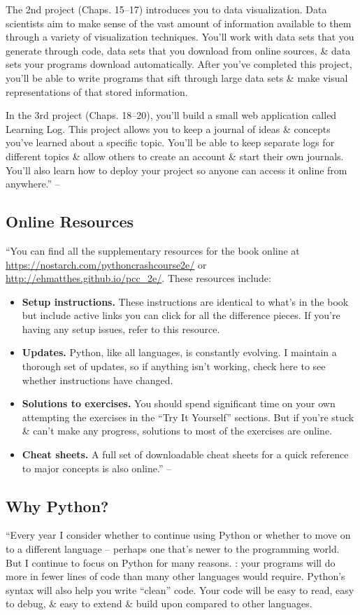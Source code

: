 \documentclass[oneside]{book}
\numberwithin{equation}{section}
\begin{document}
The 2nd project (Chaps. 15--17) introduces you to data visualization. Data scientists aim to make sense of the vast amount of information available to them through a variety of visualization techniques. You'll work with data sets that you generate through code, data sets that you download from online sources, \& data sets your programs download automatically. After you've completed this project, you'll be able to write programs that sift through large data sets \& make visual representations of that stored information.

In the 3rd project (Chaps. 18--20), you'll build a small web application called Learning Log. This project allows you to keep a journal of ideas \& concepts you've learned about a specific topic. You'll be able to keep separate logs for different topics \& allow others to create an account \& start their own journals. You'll also learn how to deploy your project so anyone can access it online from anywhere.'' -- \cite[Introduction, pp. xxxiv--xxxv]{Matthes2019}

\subsection*{Online Resources}
``You can find all the supplementary resources for the book online at \url{https://nostarch.com/pythoncrashcourse2e/} or \url{http://ehmatthes.github.io/pcc_2e/}. These resources include:
\begin{itemize}
	\item \textbf{Setup instructions.} These instructions are identical to what's in the book but include active links you can click for all the difference pieces. If you're having any setup issues, refer to this resource.
	\item \textbf{Updates.} Python, like all languages, is constantly evolving. I maintain a thorough set of updates, so if anything isn't working, check here to see whether instructions have changed.
	\item \textbf{Solutions to exercises.} You should spend significant time on your own attempting the exercises in the ``Try It Yourself'' sections. But if you're stuck \& can't make any progress, solutions to most of the exercises are online.
	\item \textbf{Cheat sheets.} A full set of downloadable cheat sheets for a quick reference to major concepts is also online.'' -- \cite[Introduction, p. xxxv]{Matthes2019}
\end{itemize}

\subsection*{Why Python?}
``Every year I consider whether to continue using Python or whether to move on to a different language -- perhaps one that's newer to the programming world. But I continue to focus on Python for many reasons. : your programs will do more in fewer lines of code than many other languages would require. Python's syntax will also help you write ``clean'' code. Your code will be easy to read, easy to debug, \& easy to extend \& build upon compared to other languages.
\end{document}
